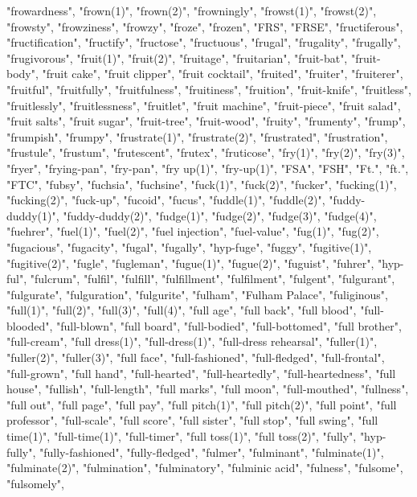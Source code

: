 "frowardness",
"frown(1)",
"frown(2)",
"frowningly",
"frowst(1)",
"frowst(2)",
"frowsty",
"frowziness",
"frowzy",
"froze",
"frozen",
"FRS",
"FRSE",
"fructiferous",
"fructification",
"fructify",
"fructose",
"fructuous",
"frugal",
"frugality",
"frugally",
"frugivorous",
"fruit(1)",
"fruit(2)",
"fruitage",
"fruitarian",
"fruit-bat",
"fruit-body",
"fruit cake",
"fruit clipper",
"fruit cocktail",
"fruited",
"fruiter",
"fruiterer",
"fruitful",
"fruitfully",
"fruitfulness",
"fruitiness",
"fruition",
"fruit-knife",
"fruitless",
"fruitlessly",
"fruitlessness",
"fruitlet",
"fruit machine",
"fruit-piece",
"fruit salad",
"fruit salts",
"fruit sugar",
"fruit-tree",
"fruit-wood",
"fruity",
"frumenty",
"frump",
"frumpish",
"frumpy",
"frustrate(1)",
"frustrate(2)",
"frustrated",
"frustration",
"frustule",
"frustum",
"frutescent",
"frutex",
"fruticose",
"fry(1)",
"fry(2)",
"fry(3)",
"fryer",
"frying-pan",
"fry-pan",
"fry up(1)",
"fry-up(1)",
"FSA",
"FSH",
"Ft.",
"ft.",
"FTC",
"fubsy",
"fuchsia",
"fuchsine",
"fuck(1)",
"fuck(2)",
"fucker",
"fucking(1)",
"fucking(2)",
"fuck-up",
"fucoid",
"fucus",
"fuddle(1)",
"fuddle(2)",
"fuddy-duddy(1)",
"fuddy-duddy(2)",
"fudge(1)",
"fudge(2)",
"fudge(3)",
"fudge(4)",
"fuehrer",
"fuel(1)",
"fuel(2)",
"fuel injection",
"fuel-value",
"fug(1)",
"fug(2)",
"fugacious",
"fugacity",
"fugal",
"fugally",
"hyp-fuge",
"fuggy",
"fugitive(1)",
"fugitive(2)",
"fugle",
"fugleman",
"fugue(1)",
"fugue(2)",
"fuguist",
"fuhrer",
"hyp-ful",
"fulcrum",
"fulfil",
"fulfill",
"fulfillment",
"fulfilment",
"fulgent",
"fulgurant",
"fulgurate",
"fulguration",
"fulgurite",
"fulham",
"Fulham Palace",
"fuliginous",
"full(1)",
"full(2)",
"full(3)",
"full(4)",
"full age",
"full back",
"full blood",
"full-blooded",
"full-blown",
"full board",
"full-bodied",
"full-bottomed",
"full brother",
"full-cream",
"full dress(1)",
"full-dress(1)",
"full-dress rehearsal",
"fuller(1)",
"fuller(2)",
"fuller(3)",
"full face",
"full-fashioned",
"full-fledged",
"full-frontal",
"full-grown",
"full hand",
"full-hearted",
"full-heartedly",
"full-heartedness",
"full house",
"fullish",
"full-length",
"full marks",
"full moon",
"full-mouthed",
"fullness",
"full out",
"full page",
"full pay",
"full pitch(1)",
"full pitch(2)",
"full point",
"full professor",
"full-scale",
"full score",
"full sister",
"full stop",
"full swing",
"full time(1)",
"full-time(1)",
"full-timer",
"full toss(1)",
"full toss(2)",
"fully",
"hyp-fully",
"fully-fashioned",
"fully-fledged",
"fulmer",
"fulminant",
"fulminate(1)",
"fulminate(2)",
"fulmination",
"fulminatory",
"fulminic acid",
"fulness",
"fulsome",
"fulsomely",

